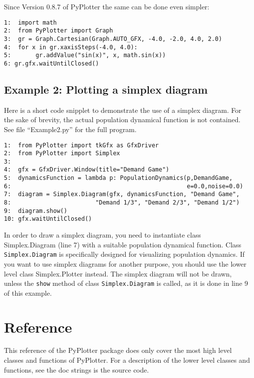 \documentclass[12pt,a4paper,USenglish]{article}
\begin{document}
Since Version 0.8.7 of PyPlotter the same can be done even simpler:

\begin{verbatim}
1:  import math
2:  from PyPlotter import Graph 
3:  gr = Graph.Cartesian(Graph.AUTO_GFX, -4.0, -2.0, 4.0, 2.0)    
4:  for x in gr.xaxisSteps(-4.0, 4.0):
5:       gr.addValue("sin(x)", x, math.sin(x))
6: gr.gfx.waitUntilClosed()
\end{verbatim}


\subsection{Example 2: Plotting a simplex diagram}

Here is a short code snipplet to demonstrate the use of a simplex diagram.
For the sake of brevity, the actual population dynamical function is
not contained. See file ``Example2.py'' for the full program.

\begin{verbatim}
1:  from PyPlotter import tkGfx as GfxDriver
2:  from PyPlotter import Simplex
3:
4:  gfx = GfxDriver.Window(title="Demand Game")   
5:  dynamicsFunction = lambda p: PopulationDynamics(p,DemandGame, 
6:                                                  e=0.0,noise=0.0)
7:  diagram = Simplex.Diagram(gfx, dynamicsFunction, "Demand Game",
8:                        "Demand 1/3", "Demand 2/3", "Demand 1/2")
9:  diagram.show()
10: gfx.waitUntilClosed()
\end{verbatim}

In order to draw a simplex diagram, you need to instantiate class
Simplex.Diagram (line 7) with a suitable population dynamical
function. Class {\tt Simplex.Diagram} is specifically designed for
visualizing population dynamics. If you want to use simplex diagrams
for another purpose, you should use the lower level class
Simplex.Plotter instead. The simplex diagram will not be drawn, unless
the {\tt show} method of class {\tt Simplex.Diagram} is called, as it
is done in line 9 of this example.

\section{Reference}

This reference of the {\sf PyPlotter} package does only cover the most high
level classes and functions of {\sf PyPlotter}. For a description of the
lower level classes and functions, see the doc strings is the source
code.
\end{document}
